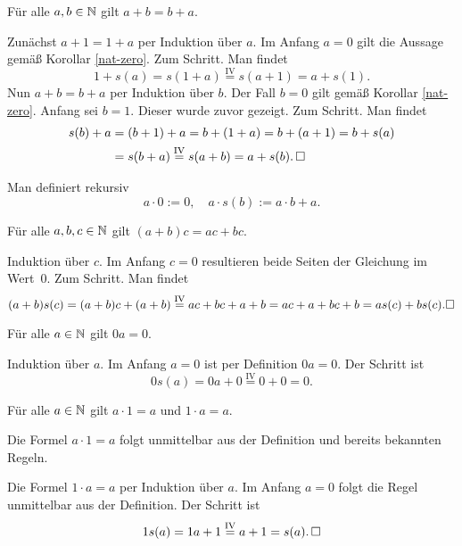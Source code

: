\begin{Korollar}\newlinefirst
Für alle $a,b\in\mathbb N$ gilt $a+b = b+a$.
\end{Korollar}
\begin{Beweis}
Zunächst $a+1 = 1+a$ per Induktion über $a$. Im Anfang $a=0$ gilt
die Aussage gemäß Korollar \ref{nat-zero}. Zum Schritt. Man findet
\[1+s(a) = s(1+a) \stackrel{\mathrm{IV}}= s(a+1) = a+s(1).\]
Nun $a+b=b+a$ per Induktion über $b$. Der Fall $b=0$
gilt gemäß Korollar \ref{nat-zero}. Anfang sei $b=1$. Dieser
wurde zuvor gezeigt. Zum Schritt. Man findet
\begin{align*}
s(b) + a &= (b+1)+a = b+(1+a) = b+(a+1) = b+s(a)\\
&= s(b+a)\stackrel{\mathrm{IV}}= s(a+b) = a+s(b).\,\square
\end{align*}
\end{Beweis}

\begin{Definition}\newlinefirst
Man definiert rekursiv
\[a\cdot 0 := 0,\quad a\cdot s(b) := a\cdot b+a.\]
\end{Definition}

\begin{Korollar}\newlinefirst
Für alle $a,b,c\in\mathbb N$ gilt $(a+b)c = ac+bc$.
\end{Korollar}
\begin{Beweis} Induktion über $c$. Im Anfang $c=0$ resultieren
beide Seiten der Gleichung im Wert~$0$. Zum Schritt. Man findet
\[(a+b)s(c) = (a+b)c+(a+b) \stackrel{\mathrm{IV}}= ac+bc+a+b = ac+a+bc+b
= as(c) + bs(c).\square\]
\end{Beweis}

\begin{Lemma}\label{nat-mul-zero}
Für alle $a\in\mathbb N$ gilt $0a=0$.
\end{Lemma}
\begin{Beweis}
Induktion über $a$. Im Anfang $a=0$ ist per Definition $0a=0$.
Der Schritt ist
\[0s(a) = 0a+0 \stackrel{\mathrm{IV}}= 0+0 = 0.\]
\end{Beweis}

\begin{Korollar}\label{nat-mul-one}
Für alle $a\in\mathbb N$ gilt $a\cdot 1=a$ und $1\cdot a=a$.
\end{Korollar}
\begin{Beweis}
Die Formel $a\cdot 1 = a$ folgt unmittelbar aus der Definition
und bereits bekannten Regeln.

Die Formel $1\cdot a = a$ per Induktion über $a$. Im Anfang $a=0$ folgt
die Regel unmittelbar aus der Definition. Der Schritt ist
\[1s(a) = 1a+1 \stackrel{\mathrm{IV}}= a+1 = s(a).\,\square\]
\end{Beweis}

